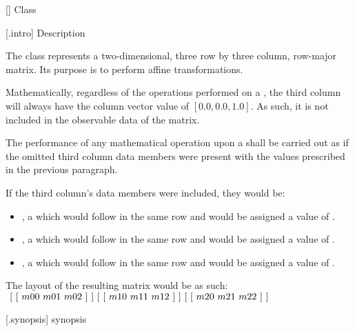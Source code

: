  [\matrixtwod] {Class }

 [\matrixtwod.intro] { Description}

\pnum
{}
The  class represents a two-dimensional, three row by three column, row-major matrix. Its purpose is to perform affine transformations.

\pnum
Mathematically, regardless of the operations performed on a , the third column will always have the column vector value of $[0.0, 0.0, 1.0]$. As such, it is not included in the observable data of the matrix.

\pnum
The performance of any mathematical operation upon a  shall be carried out as if the omitted third column data members were present with the values prescribed in the previous paragraph.

\pnum
\enternote
If the third column's data members were included, they would be:

\begin{itemize}
	\item {}, a  which would follow  in the same row and would be assigned a value of .
	
	\item {}, a  which would follow  in the same row and would be assigned a value of .
	
	\item {}, a  which would follow  in the same row and would be assigned a value of .
\end{itemize}

\pnum
The layout of the resulting matrix would be as such: \\
$
~[~[~m00~m01~m02~]~] \\
~[~[~m10~m11~m12~]~] \\
~[~[~m20~m21~m22~]~]$
\exitnote

 [\matrixtwod.synopsis] { synopsis}

